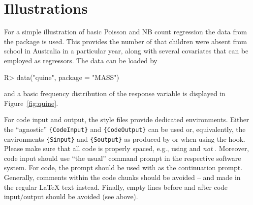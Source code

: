 \documentclass[article]{jss}
\newcommand{\fct}[1]{\code{#1()}}
\begin{document}


\section{Illustrations} \label{sec:illustrations}

For a simple illustration of basic Poisson and NB count regression the
 data from the  package is used. This provides the number
of  that children were absent from school in Australia in a
particular year, along with several covariates that can be employed as regressors.
The data can be loaded by
%
\begin{CodeChunk}
\begin{CodeInput}
R> data("quine", package = "MASS")
\end{CodeInput}
\end{CodeChunk}
%
and a basic frequency distribution of the response variable is displayed in
Figure~\ref{fig:quine}.

\begin{leftbar}
For code input and output, the style files provide dedicated environments.
Either the ``agnostic'' \verb|{CodeInput}| and \verb|{CodeOutput}| can be used
or, equivalently, the environments \verb|{Sinput}| and \verb|{Soutput}| as
produced by \fct{Sweave} or  when using the 
hook. Please make sure that all code is properly spaced, e.g., using
 and \emph{not} . Moreover, code input should
use ``the usual'' command prompt in the respective software system. For
 code, the prompt  should be used with  as
the continuation prompt. Generally, comments within the code chunks should be
avoided -- and made in the regular {\LaTeX} text instead. Finally, empty lines
before and after code input/output should be avoided (see above).
\end{leftbar}
\end{document}
